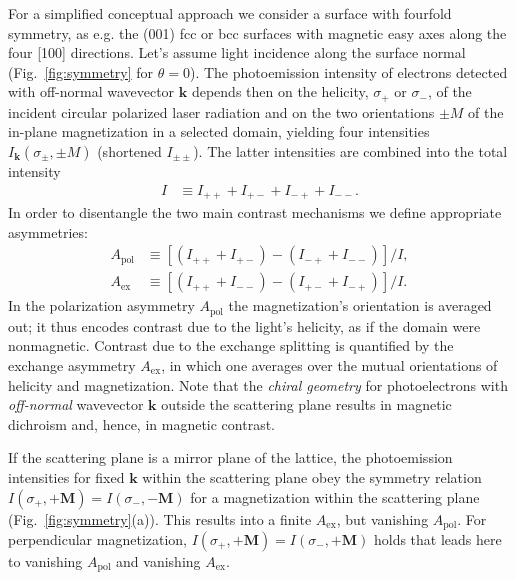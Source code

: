 \documentclass[prl,twocolumn,floatfix]{revtex4-2}
\renewcommand{\vec}[1]{\boldsymbol{#1}}
\begin{document}
For a simplified conceptual approach we consider a surface with fourfold symmetry, as e.g. the (001) fcc or bcc surfaces with magnetic easy axes along the four [100] directions. Let's assume light incidence along the surface normal (Fig.~\ref{fig:symmetry} for $\theta=0$). The photoemission intensity of electrons detected with off-normal wavevector $\vec{k}$ depends then on the helicity, $\sigma_{+}$ or $\sigma_{-}$, of the incident circular polarized laser radiation and on the two orientations $\pm M$ of the in-plane magnetization in a selected domain, yielding four intensities $I_{\vec{k}}(\sigma_{\pm}, \pm M)$ (shortened $I_{\pm \pm}$). The latter intensities are combined into the total intensity
\begin{align}
    I & \equiv I_{+ +} + I_{+ -} + I_{- +} + I_{- -}. 
\end{align}
In order to disentangle the two main contrast mechanisms we define appropriate asymmetries:
\begin{subequations}
\begin{align}
    A_{\mathrm{pol}} & \equiv \left[ \left( I_{+ +} + I_{+ -} \right) - \left( I_{- +} + I_{- -} \right) \right] / I,
    \label{eq:Apol}
    \\
    A_{\mathrm{ex}} & \equiv \left[ \left( I_{+ +} + I_{- -} \right) - \left( I_{+ -} + I_{- +} \right) \right] / I.
    \label{eq:Aex}
\end{align}    
\end{subequations}
In the polarization asymmetry $A_{\mathrm{pol}}$ the magnetization's orientation is averaged out; it thus encodes contrast due to the light's helicity, as if the domain were nonmagnetic. Contrast due to the exchange splitting is quantified by the exchange asymmetry $A_{\mathrm{ex}}$, in which one averages over the mutual orientations of helicity and magnetization. Note that the \textit{chiral geometry} for photoelectrons with \textit{off-normal} wavevector $\vec{k}$ outside the scattering plane results in magnetic dichroism and, hence, in magnetic contrast.


If the scattering plane is a mirror plane of the lattice, the photoemission intensities for fixed $\vec{k}$ within the scattering plane obey the symmetry relation $I(\sigma_{+}, +\vec{M}) = I(\sigma_{-}, -\vec{M})$ for a magnetization within the scattering plane (Fig.~\ref{fig:symmetry}(a)). This results into a finite $A_{\mathrm{ex}}$, but vanishing $A_{\mathrm{pol}}$. For perpendicular magnetization, $I(\sigma_{+}, +\vec{M}) = I(\sigma_{-}, +\vec{M})$ holds that leads here to vanishing $A_{\mathrm{pol}}$ and vanishing $A_{\mathrm{ex}}$.
\end{document}
